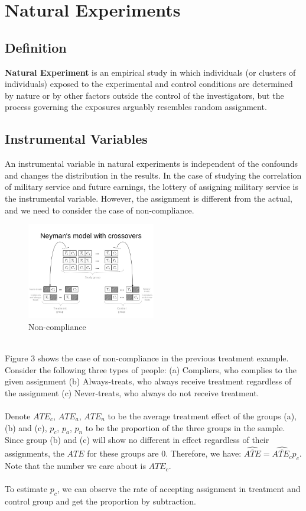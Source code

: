 \section{Natural Experiments}
\subsection{Definition}
\textbf{Natural Experiment} is an empirical study in which individuals (or clusters of individuals) exposed to the experimental and control conditions are determined by nature or by other factors outside the control of the investigators, but the process governing the exposures arguably resembles random assignment.

\subsection{Instrumental Variables}
An instrumental variable in natural experiments is independent of the confounds and changes the distribution in the results. In the case of studying the correlation of military service and future earnings, the lottery of assigning military service is the instrumental variable. However, the assignment is different from the actual, and we need to consider the case of non-compliance.
\\
\begin{figure}[ht]
  \begin{center}
    \includegraphics[width=0.5\textwidth]{figures/natural-experiments-37-638.jpg}
    \caption{Non-compliance
      }
    \label{fig:Non-compliance}
  \end{center}
\end{figure}
\\
Figure 3 shows the case of non-compliance in the previous treatment example. Consider the following three types of people: (a) Compliers, who complies to the given assignment (b) Always-treats, who always receive treatment regardless of the assignment (c) Never-treats, who always do not receive treatment.
\\
\\
Denote $ATE_c$, $ATE_a$, $ATE_n$ to be the average treatment effect of the groups (a),(b) and (c), $p_c$, $p_a$, $p_n$ to be the proportion of the three groups in the sample. Since group (b) and (c) will show no different in effect regardless of their assignments, the $ATE$ for these groups are 0. Therefore, we have: $\hat{\overline{ATE}} = \hat{\overline{ATE_c}}p_c$. Note that the number we care about is $ATE_c$.
\\
\\
To estimate $p_c$, we can observe the rate of accepting assignment in treatment and control group and get the proportion by subtraction.
